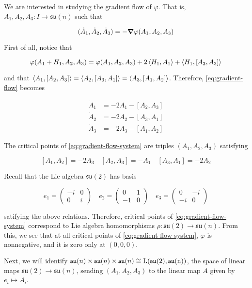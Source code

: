 \documentclass{report}
\newcommand{\su}{\mathfrak{su}}
\begin{document}
We are interested in studying the gradient flow of \(\varphi\). That is, \(A_1, A_2, A_3 : I \to \su(n)\) such that

\begin{equation}
    \label{eq:gradient-flow}
    (\dot A_1, \dot A_2, \dot A_3) = -\grad \varphi(A_1, A_2, A_3)
\end{equation}

First of all, notice that

\[\varphi(A_1 + H_1, A_2, A_3) = \varphi(A_1, A_2, A_3) + 2\left\langle H_1, A_1 \right\rangle + \left\langle H_1, [A_2, A_3] \right\rangle\]

and that \(\left\langle A_1, [A_2, A_3] \right\rangle = \left\langle A_2, [A_3, A_1] \right\rangle = \left\langle A_3, [A_1, A_2] \right\rangle\). Therefore, \cref{eq:gradient-flow} becomes

\begin{equation}
    \label{eq:gradient-flow-system}
    \begin{split}
        \dot A_1 &= -2A_1 - [A_2, A_3] \\
        \dot A_2 &= -2A_2 - [A_3, A_1] \\
        \dot A_3 &= -2A_3 - [A_1, A_2]
    \end{split}
\end{equation}

The critical points of \cref{eq:gradient-flow-system} are triples \((A_1, A_2, A_3)\) satisfying

\[[A_1, A_2] = -2A_3 \quad [A_2, A_3] = -A_1 \quad [A_3, A_1] = -2A_2\]

Recall that the Lie algebra \(\su(2)\) has basis

\[e_1 = \begin{pmatrix}
    -i & 0 \\
    0 & i
\end{pmatrix} \quad e_2 = \begin{pmatrix}
    0 & 1 \\
    -1 & 0
\end{pmatrix} \quad e_3 = \begin{pmatrix}
    0 & -i \\
    -i & 0
\end{pmatrix}\]

satifying the above relations. Therefore, critical points of \cref{eq:gradient-flow-system} correspond to Lie algebra homomorphisms \(\rho : \su(2) \to \su(n)\). From this, we see that at all critical points of \cref{eq:gradient-flow-system}, \(\varphi\) is nonnegative, and it is zero only at \((0, 0, 0)\).

Next, we will identify \(\su(n) \times \su(n) \times \su(n) \cong \rm L(\su(2), \su(n))\), the space of linear maps \(\su(2) \to \su(n)\), sending \((A_1, A_2, A_3)\) to the linear map \(A\) given by \(e_i \mapsto A_i\).
\end{document}
